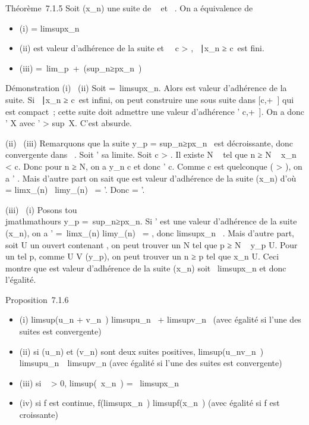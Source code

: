 \documentclass[]{article}
\begin{document}
Théorème~7.1.5 Soit (x_n) une suite de
\overline{}~ et \ell \in\overline{}~. On a
équivalence de

\begin{itemize}
\itemsep1pt\parskip0pt
\item
  (i) \ell = limsupx_n~
\item
  (ii) \ell est valeur d'adhérence de la suite et
  \forall~~c \textgreater{} \ell, \n \in
  ~∣x_n ≥ c\ est
  fini.
\item
  (iii) \ell =\
  lim_p\rightarrow~+\infty~(sup_n≥px_n~)
\end{itemize}

Démonstration (i) \rigtharrow~(ii) Soit \ell =\
limsupx_n. Alors \ell est valeur d'adhérence de la suite. Si
\n \in \mathbb{N}~∣x_n ≥
c\ est infini, on peut construire une sous suite dans
{[}c,+\infty~{]} qui est compact~; cette suite doit admettre une valeur
d'adhérence \ell' \in {[}c,+\infty~{]}. On a donc \ell' \in X avec \ell'
\textgreater{} sup~X. C'est absurde.

(ii) \rigtharrow~(iii) Remarquons que la suite y_p
= sup_n≥px_n~ est
décroissante, donc convergente dans \overline{}~. Soit
\ell' sa limite. Soit c \textgreater{} \ell. Il existe N \in {}~ tel que n ≥ N \rigtharrow~
x_n \textless{} c. Donc pour n ≥ N, on a y_n \leq c et
donc \ell' \leq c. Comme c est quelconque ( \textgreater{} \ell), on a \ell' \leq \ell.
Mais d'autre part on sait que \ell est valeur d'adhérence de la suite
(x_n) d'où \ell = limx_\phi(n)~
\leq limy_\phi(n)~ = \ell'. Donc \ell = \ell'.

(iii) \rigtharrow~(i) Posons tou\\jmathmathours y_p =\
sup_n≥px_n. Si \ell' est une valeur d'adhérence de la
suite (x_n), on a \ell' =\
limx_\phi(n) \leq limy_\phi(n)~ = \ell,
donc limsupx_n~ \leq \ell. Mais d'autre
part, soit U un ouvert contenant \ell, on peut trouver un N tel que p ≥ N \rigtharrow~
y_p \in U. Pour un tel p, comme U \in V (y_p), on peut
trouver un n ≥ p tel que x_n \in U. Ceci montre que \ell est valeur
d'adhérence de la suite (x_n) soit \ell \leq\
limsupx_n et donc l'égalité.

Proposition~7.1.6

\begin{itemize}
\itemsep1pt\parskip0pt
\item
  (i) limsup(u_n + v_n~)
  \leq limsupu_n~
  + limsupv_n~ (avec égalité si l'une
  des suites est convergente)
\item
  (ii) si (u_n) et (v_n) sont deux suites positives,
  limsup(u_nv_n~)
  \leq limsupu_n~\
  limsupv_n (avec égalité si l'une des suites est
  convergente)
\item
  (iii) si \lambda~ \textgreater{} 0,
  limsup(\lambda~x_n~) =
  \lambda~limsupx_n~
\item
  (iv) si f est continue,
  f(limsupx_n~)
  \leq limsupf(x_n~) (avec égalité si f
  est croissante)
\end{itemize}
\end{document}
